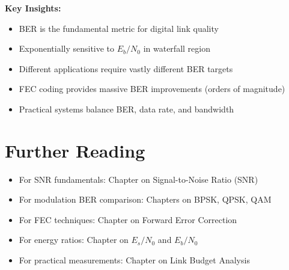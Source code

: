 \textbf{Key Insights:}
\begin{itemize}
\item BER is the fundamental metric for digital link quality
\item Exponentially sensitive to $E_b/N_0$ in waterfall region
\item Different applications require vastly different BER targets
\item FEC coding provides massive BER improvements (orders of magnitude)
\item Practical systems balance BER, data rate, and bandwidth
\end{itemize}

\section{Further Reading}

\begin{itemize}
\item For SNR fundamentals: Chapter on Signal-to-Noise Ratio (SNR)
\item For modulation BER comparison: Chapters on BPSK, QPSK, QAM
\item For FEC techniques: Chapter on Forward Error Correction
\item For energy ratios: Chapter on $E_s/N_0$ and $E_b/N_0$
\item For practical measurements: Chapter on Link Budget Analysis
\end{itemize}
